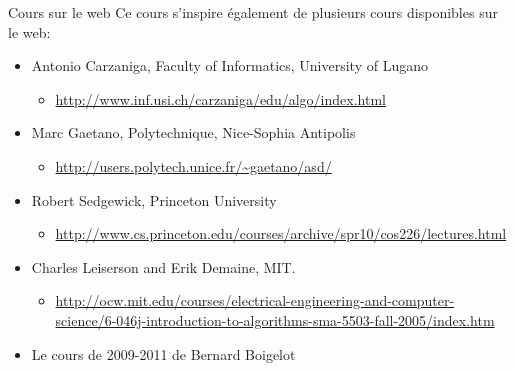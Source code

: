 \begin{frame}{Cours sur le web}
Ce cours s'inspire également de plusieurs cours disponibles sur le web:
\begin{itemize}
\item Antonio Carzaniga, Faculty of Informatics, University of Lugano
\begin{itemize}
\item \url{http://www.inf.usi.ch/carzaniga/edu/algo/index.html}
\end{itemize}
\item Marc Gaetano, Polytechnique, Nice-Sophia Antipolis
\begin{itemize}
\item \url{http://users.polytech.unice.fr/~gaetano/asd/}
\end{itemize}
\item Robert Sedgewick, Princeton University
\begin{itemize}
\item \url{http://www.cs.princeton.edu/courses/archive/spr10/cos226/lectures.html}
\end{itemize}
\item Charles Leiserson and Erik Demaine, MIT.
\begin{itemize}
\item \url{http://ocw.mit.edu/courses/electrical-engineering-and-computer-science/6-046j-introduction-to-algorithms-sma-5503-fall-2005/index.htm}
\end{itemize}
\item Le cours de 2009-2011 de Bernard Boigelot
\end{itemize}
\end{frame}
